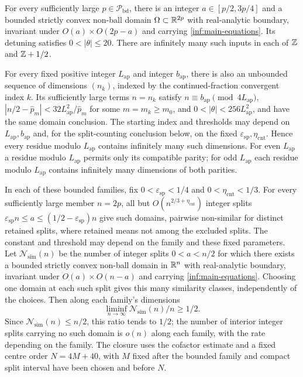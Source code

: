 \begin{maintheorem}\label{inf:main}\label{inf:theorem-A}
For every sufficiently large $p\in\mathcal P_{\mathrm{bd}}$, there
is an integer $a\in[p/2,3p/4]$ and a bounded strictly convex non-ball
domain $\Omega\subset\mathbb{R}^{2p}$ with real-analytic boundary,
invariant under $O(a)\times O(2p-a)$ and carrying
\eqref{inf:main-equations}. Its detuning satisfies $0<|\theta|\le20$.
There are infinitely many such inputs in each of $\mathbb{Z}$ and $\mathbb{Z}+1/2$.

For every fixed positive integer $L_{\mathrm{ap}}$ and integer
$b_{\mathrm{ap}}$, there is also an unbounded sequence of dimensions
$(n_k)$, indexed by the continued-fraction convergent index $k$.
Its sufficiently large terms $n=n_k$ satisfy
$n\equiv b_{\mathrm{ap}}\pmod{4L_{\mathrm{ap}}}$,
$|n/2-\widehat p_m|<32L_{\mathrm{ap}}^2/\widehat p_m$ for some
$m=m_k\ge m_0$, and $0<|\theta|<256L_{\mathrm{ap}}^2$,
and have the same domain conclusion. The starting index and thresholds
may depend on $L_{\mathrm{ap}},b_{\mathrm{ap}}$ and, for the split-counting
conclusion below, on the fixed $\varepsilon_{\mathrm{sp}},\eta_{\mathrm{cnt}}$. Hence every residue modulo
$L_{\mathrm{ap}}$ contains infinitely many such dimensions.
For even $L_{\mathrm{ap}}$ a residue modulo $L_{\mathrm{ap}}$ permits
only its compatible parity; for odd $L_{\mathrm{ap}}$ each residue
modulo $L_{\mathrm{ap}}$ contains infinitely many dimensions of both parities.

In each of these bounded families, fix
$0<\varepsilon_{\mathrm{sp}}<1/4$ and $0<\eta_{\mathrm{cnt}}<1/3$.
For every sufficiently large member $n=2p$, all but
$O(n^{2/3+\eta_{\mathrm{cnt}}})$ integer splits
$\varepsilon_{\mathrm{sp}}n\le a\le(1/2-\varepsilon_{\mathrm{sp}})n$
give such domains, pairwise non-similar for distinct retained splits,
where retained means not among the excluded splits.
The constant and threshold may depend on the family and these fixed
parameters. Let $\mathcal N_{\mathrm{sim}}(n)$ be the number of
integer splits $0<a<n/2$ for which there exists a bounded strictly
convex non-ball domain in $\mathbb{R}^n$ with real-analytic boundary,
invariant under $O(a)\times O(n-a)$ and carrying
\eqref{inf:main-equations}. Choosing one domain at
each such split gives this many similarity classes, independently
of the choices.
Then along each family's dimensions
\[
 \liminf_{n\to\infty}\mathcal N_{\mathrm{sim}}(n)/n\ge1/2.
\]
Since $\mathcal N_{\mathrm{sim}}(n)\le n/2$, this ratio tends to
$1/2$; the number of interior integer splits carrying no such domain
is $o(n)$ along each family, with the rate depending on the family.
The closure uses the cofactor estimate and a fixed centre order
$N=4M+40$, with $M$ fixed after the bounded family and compact
split interval have been chosen and before $N$.
\end{maintheorem}

